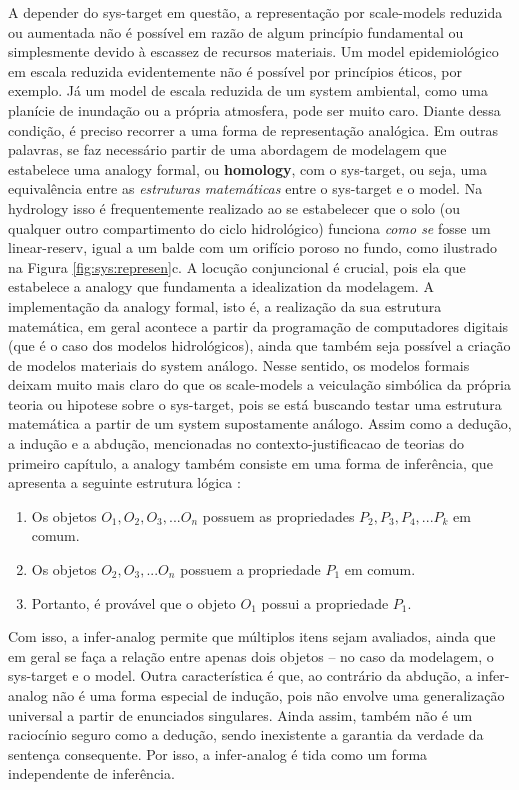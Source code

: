 \documentclass[./main.tex]{subfiles}
\begin{document}
\par A depender do \gls{sys-target} em questão, a representação por \gls{scale-models} reduzida ou aumentada não é possível em razão de algum princípio fundamental ou simplesmente devido à escassez de recursos materiais. Um \gls{model} epidemiológico em escala reduzida evidentemente não é possível por princípios éticos, por exemplo. Já um \gls{model} de escala reduzida de um \gls{system} ambiental, como uma planície de inundação ou a própria atmosfera, pode ser muito caro. Diante dessa condição, é preciso recorrer a uma forma de representação analógica. Em outras palavras, se faz necessário partir de uma abordagem de modelagem que estabelece uma \gls{analogy} formal, ou \textbf{\gls{homology}}, com o \gls{sys-target}, ou seja, uma equivalência entre as \textit{estruturas matemáticas} entre o \gls{sys-target} e o \gls{model}. Na \gls{hydrology} isso é frequentemente realizado ao se estabelecer que o solo (ou qualquer outro compartimento do ciclo hidrológico) funciona \textit{como se} fosse um \gls{linear-reserv}, igual a um balde com um orifício poroso no fundo, como ilustrado na Figura \ref{fig:sys:represen}c. A locução conjuncional  é crucial, pois ela que estabelece a \gls{analogy} que fundamenta a \gls{idealization} da modelagem. A implementação da \gls{analogy} formal, isto é, a realização da sua estrutura matemática, em geral acontece a partir da programação de computadores digitais (que é o caso dos modelos hidrológicos), ainda que também seja possível a criação de modelos materiais do \gls{system} análogo. Nesse sentido, os modelos formais deixam muito mais claro do que os \gls{scale-models} a veiculação simbólica da própria \gls{teoria} ou \gls{hipotese} sobre o \gls{sys-target}, pois se está buscando testar uma estrutura matemática a partir de um \gls{system} supostamente análogo. Assim como a dedução, a indução e a abdução, mencionadas no \gls{contexto-justificacao} de teorias do primeiro capítulo, a \gls{analogy} também consiste em uma forma de inferência, que apresenta a seguinte estrutura lógica \cite{shaw_ashley_1983}:
\begin{enumerate}
    \item Os objetos $O_1, O_2, O_3, ... O_n$ possuem as propriedades $P_2, P_3, P_4, ... P_k$ em comum. 
    \item Os objetos $O_2, O_3, ... O_n$ possuem a propriedade $P_1$ em comum. \\
    \item Portanto, é provável que o objeto $O_1$ possui a propriedade $P_1$.
\end{enumerate}
Com isso, a \gls{infer-analog} permite que múltiplos itens sejam avaliados, ainda que em geral se faça a relação entre apenas dois objetos – no caso da modelagem, o \gls{sys-target} e o \gls{model}. Outra característica é que, ao contrário da abdução, a \gls{infer-analog} não é uma forma especial de indução, pois não envolve uma generalização universal a partir de enunciados singulares. Ainda assim, também não é um raciocínio seguro como a dedução, sendo inexistente a garantia da verdade da sentença consequente. Por isso, a \gls{infer-analog} é tida como um forma independente de inferência.
\end{document}
